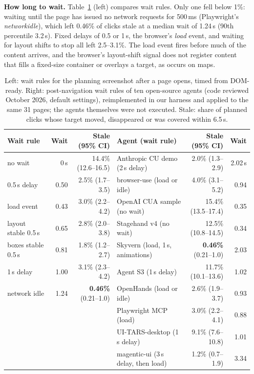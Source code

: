 \documentclass[10pt]{article}
\begin{document}
\textbf{How long to wait.} Table~\ref{tab:settle} (left) compares wait rules. Only one fell below 1\%: waiting until the page has issued no network requests for 500\,ms (Playwright's \emph{networkidle}), which left 0.46\% of clicks stale at a median wait of 1.24\,s (90th percentile 3.2\,s). Fixed delays of 0.5 or 1\,s, the browser's \emph{load} event, and waiting for layout shifts to stop all left 2.5--3.1\%. The load event fires before much of the content arrives, and the browser's layout-shift signal does not register content that fills a fixed-size container or overlays a target, as occurs on maps.

\begin{table}[t]
\centering\small\setlength{\tabcolsep}{5pt}
\caption{Left: wait rules for the planning screenshot after a page opens, timed from DOM-ready. Right: post-navigation wait rules of ten open-source agents (code reviewed October 2026, default settings), reimplemented in our harness and applied to the same 31 pages; the agents themselves were not executed. Stale: share of planned clicks whose target moved, disappeared or was covered within 6.5\,s.}
\label{tab:settle}
\begin{tabular}{lrr@{\hskip 12pt}lrr}
\toprule
Wait rule & Wait & Stale (95\% CI) & Agent (wait rule) & Stale (95\% CI) & Wait \\
\midrule
no wait & 0\,s & 14.4\% (12.6--16.5) & Anthropic CU demo (2\,s delay) & 2.0\% (1.3--2.9) & 2.02\,s \\
0.5\,s delay & 0.50 & 2.5\% (1.7--3.5) & browser-use (load or idle) & 4.0\% (3.1--5.2) & 0.94 \\
load event & 0.43 & 3.0\% (2.2--4.2) & OpenAI CUA sample (no wait) & 15.4\% (13.5--17.4) & 0.35 \\
layout stable 0.5\,s & 0.65 & 2.8\% (2.0--3.8) & Stagehand v4 (no wait) & 12.5\% (10.8--14.5) & 0.34 \\
boxes stable 0.5\,s & 0.81 & 1.8\% (1.2--2.7) & Skyvern (load, 1\,s, animations) & \textbf{0.46\%} (0.21--1.0) & 2.03 \\
1\,s delay & 1.00 & 3.1\% (2.3--4.2) & Agent S3 (1\,s delay) & 11.7\% (10.1--13.6) & 1.02 \\
network idle & 1.24 & \textbf{0.46\%} (0.21--1.0) & OpenHands (load or idle) & 2.6\% (1.9--3.7) & 0.93 \\
 & & & Playwright MCP (load) & 3.0\% (2.2--4.1) & 0.88 \\
 & & & UI-TARS-desktop (1\,s delay) & 9.1\% (7.6--10.8) & 1.01 \\
 & & & magentic-ui (3\,s delay, then load) & 1.2\% (0.7--1.9) & 3.34 \\
\bottomrule
\end{tabular}
\end{table}
\end{document}
